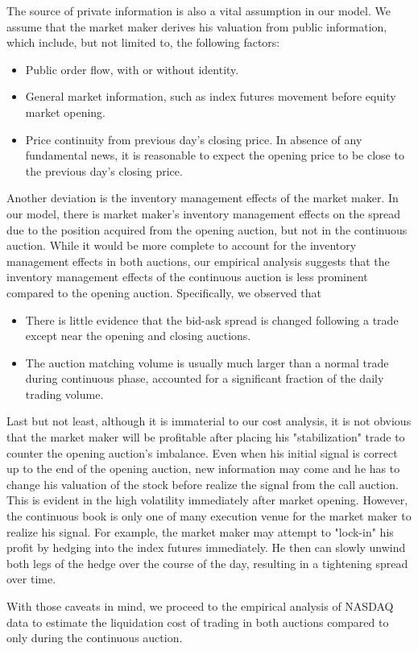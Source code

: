 The source of private information is also a vital assumption in our model. We assume that the market maker derives his valuation from public information, which include, but not limited to, the following factors:

\begin{itemize}
  \item Public order flow, with or without identity.
  \item General market information, such as index futures movement before equity market opening.
  \item Price continuity from previous day's closing price. In absence of any fundamental news, it is reasonable to expect the opening price to be close to the previous day's closing price.
\end{itemize}

Another deviation is the inventory management effects of the market maker. In our model, there is market maker's inventory management effects on the spread due to the position acquired from the opening auction, but not in the continuous auction. While it would be more complete to account for the inventory management effects in both auctions, our empirical analysis suggests that the inventory management effects of the continuous auction is less prominent compared to the opening auction. Specifically, we observed that

\begin{itemize}
  \item There is little evidence that the bid-ask spread is changed following a trade except near the opening and closing auctions.
  \item The auction matching volume is usually much larger than a normal trade during continuous phase, accounted for a significant fraction of the daily trading volume.
\end{itemize}

Last but not least, although it is immaterial to our cost analysis, it is not obvious that the market maker will be profitable after placing his "stabilization" trade to counter the opening auction's imbalance. Even when his initial signal is correct up to the end of the opening auction, new information may come and he has to change his valuation of the stock before realize the signal from the call auction. This is evident in the high volatility immediately after market opening. However, the continuous book is only one of many execution venue for the market maker to realize his signal. For example, the market maker may attempt to "lock-in" his profit by hedging into the index futures immediately. He then can slowly unwind both legs of the hedge over the course of the day, resulting in a tightening spread over time.

With those caveats in mind, we proceed to the empirical analysis of NASDAQ data to estimate the liquidation cost of trading in both auctions compared to only during the continuous auction.